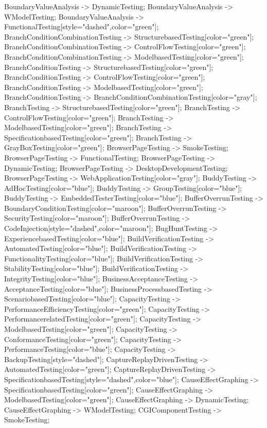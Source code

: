 \documentclass{article}
\begin{document}
{BoundaryValueAnalysis -> DynamicTesting;
BoundaryValueAnalysis -> WModelTesting;
BoundaryValueAnalysis -> FunctionalTesting[style="dashed",color="green"];
BranchConditionCombinationTesting -> StructurebasedTesting[color="green"];
BranchConditionCombinationTesting -> ControlFlowTesting[color="green"];
BranchConditionCombinationTesting -> ModelbasedTesting[color="green"];
BranchConditionTesting -> StructurebasedTesting[color="green"];
BranchConditionTesting -> ControlFlowTesting[color="green"];
BranchConditionTesting -> ModelbasedTesting[color="green"];
BranchConditionTesting -> BranchConditionCombinationTesting[color="gray"];
BranchTesting -> StructurebasedTesting[color="green"];
BranchTesting -> ControlFlowTesting[color="green"];
BranchTesting -> ModelbasedTesting[color="green"];
BranchTesting -> SpecificationbasedTesting[color="green"];
BranchTesting -> GrayBoxTesting[color="green"];
BrowserPageTesting -> SmokeTesting;
BrowserPageTesting -> FunctionalTesting;
BrowserPageTesting -> DynamicTesting;
BrowserPageTesting -> DesktopDevelopmentTesting;
BrowserPageTesting -> WebApplicationTesting[color="gray"];
BuddyTesting -> AdHocTesting[color="blue"];
BuddyTesting -> GroupTesting[color="blue"];
BuddyTesting -> EmbeddedTesterTesting[color="blue"];
BufferOverrunTesting -> BoundaryConditionTesting[color="maroon"];
BufferOverrunTesting -> SecurityTesting[color="maroon"];
BufferOverrunTesting -> CodeInjection[style="dashed",color="maroon"];
BugHuntTesting -> ExperiencebasedTesting[color="blue"];
BuildVerificationTesting -> AutomatedTesting[color="blue"];
BuildVerificationTesting -> FunctionalityTesting[color="blue"];
BuildVerificationTesting -> StabilityTesting[color="blue"];
BuildVerificationTesting -> IntegrityTesting[color="blue"];
BusinessAcceptanceTesting -> AcceptanceTesting[color="blue"];
BusinessProcessbasedTesting -> ScenariobasedTesting[color="blue"];
CapacityTesting -> PerformanceEfficiencyTesting[color="green"];
CapacityTesting -> PerformancerelatedTesting[color="green"];
CapacityTesting -> ModelbasedTesting[color="green"];
CapacityTesting -> ConformanceTesting[color="green"];
CapacityTesting -> PerformanceTesting[color="blue"];
CapacityTesting -> BackupTesting[style="dashed"];
CaptureReplayDrivenTesting -> AutomatedTesting[color="green"];
CaptureReplayDrivenTesting -> SpecificationbasedTesting[style="dashed",color="blue"];
CauseEffectGraphing -> SpecificationbasedTesting[color="green"];
CauseEffectGraphing -> ModelbasedTesting[color="green"];
CauseEffectGraphing -> DynamicTesting;
CauseEffectGraphing -> WModelTesting;
CGIComponentTesting -> SmokeTesting;
}
\end{document}

